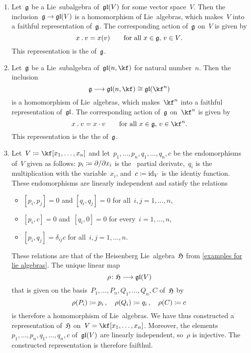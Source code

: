 \begin{examples}
  \label{examples for representations}
  \leavevmode
  \begin{enumerate}
    \item 
      Let~$\mathfrak{g}$ be a Lie~subalgebra of~$\mathfrak{gl}(V)$ for some vector space~$V$.
      Then the inclusion~$\glie \to \gllie(V)$ is a homomorphism of Lie~algebras, which makes~$V$ into a faithful representation of~$\mathfrak{g}$.
      The corresponding action of~$\mathfrak{g}$ on~$V$ is given by
      \[
        x \mathbin{.} v
        =
        x(v)
        \qquad
        \text{for all~$x \in \mathfrak{g}$,~$v \in V$.}
      \]
      This representation is the  of~$\mathfrak{g}$.
    \item
      Let~$\mathfrak{g}$ be a Lie~subalgebra of~$\gllie(n, \kf)$ for natural number~$n$.
      Then the inclusion
      \[
        \glie \to \gllie(n, \kf) \cong \gllie(\kf^n)
      \]
      is a homomorphism of Lie~algebras, which makes~$\kf^n$ into a faithful representation of~$\mathfrak{gl}$.
      The corresponding action of~$\mathfrak{g}$ on~$\kf^n$ is given by
      \[
        x \act v
        =
        x \cdot v
        \qquad
        \text{for all~$x \in \glie$,~$v \in \kf^n$.}
      \]
      This representation is the the  of~$\mathfrak{g}$.
    \item
      Let~$V \defined \kf[x_1, \dotsc, x_n]$ and let~$p_1, \dotsc, p_n, q_1, \dotsc, q_n, c$ be the endomorphisms of~$V$ given as follows:
      $p_i \defined \dd{x_i}$ is the~{} partial derivate,~$q_i$ is the multiplication with the variable~$x_i$, and~$c \coloneqq \mathrm{id}_V$ is the identiy function.
      These endomorphisms are linearly independent and satisfy the relations
      \begin{itemize}
        \item
          $[p_i, p_j] = 0$ and $[q_i, q_j] = 0$ for all~$i, j = 1, \dotsc, n$,
        \item
          $[p_i, c] = 0$ and~$[q_i, 0] = 0$ for every~$i = 1, \dotsc, n$,
        \item
          $[p_i, q_j] = \delta_{ij} c$ for all~$i, j = 1, \dotsc, n$.
      \end{itemize}
      These relations are that of the Heisenberg Lie~algebra~$\mathfrak{H}$ from \cref{examples for lie algebras}.
      The unique linear map
      \[
        \rho
        \colon
        \Hlie
        \to
        \gllie(V)
      \]
      that is given on the basis~$P_1, \dotsc, P_n, Q_1, \dotsc, Q_n, C$ of~$\mathfrak{H}$ by
      \[
        \rho(P_i) \coloneqq p_i \,,
        \quad
        \rho(Q_i) \coloneqq q_i \,,
        \quad
        \rho(C) \coloneqq c
      \]
      is therefore a homomorphism of Lie~algebras.
      We have thus constructed a representation of~$\mathfrak{H}$ on~$V = \kf[x_1, \dotsc, x_n]$.
      Moreover, the elements~$p_1, \dotsc, p_n, q_1, \dotsc, q_n, c$ of~$\mathfrak{gl}(V)$ are linearly independent, so~$\rho$ is injective.
      The constructed representation is therefore faifthul.


\end{enumerate}
\end{examples}
